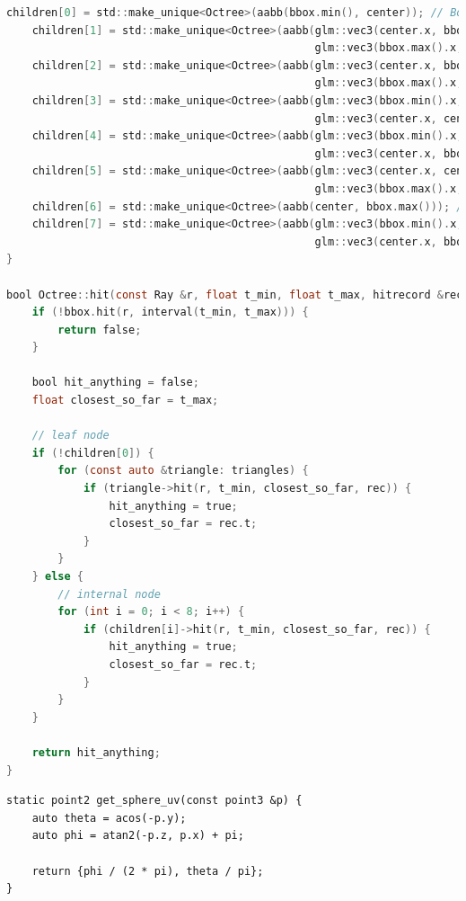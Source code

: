 \documentclass[../main.tex]{subfiles}
\begin{document}
\begin{lstlisting}[language=C, caption="Oct-Tree definition and implementation", breaklines=true]
    children[0] = std::make_unique<Octree>(aabb(bbox.min(), center)); // Bottom-left-front
    children[1] = std::make_unique<Octree>(aabb(glm::vec3(center.x, bbox.min().y, bbox.min().z),
                                                glm::vec3(bbox.max().x, center.y, center.z))); // Bottom-right-front
    children[2] = std::make_unique<Octree>(aabb(glm::vec3(center.x, bbox.min().y, center.z),
                                                glm::vec3(bbox.max().x, center.y, bbox.max().z))); // Bottom-right-back
    children[3] = std::make_unique<Octree>(aabb(glm::vec3(bbox.min().x, bbox.min().y, center.z),
                                                glm::vec3(center.x, center.y, bbox.max().z))); // Bottom-left-back
    children[4] = std::make_unique<Octree>(aabb(glm::vec3(bbox.min().x, center.y, bbox.min().z),
                                                glm::vec3(center.x, bbox.max().y, center.z))); // Top-left-front
    children[5] = std::make_unique<Octree>(aabb(glm::vec3(center.x, center.y, bbox.min().z),
                                                glm::vec3(bbox.max().x, bbox.max().y, center.z))); // Top-right-front
    children[6] = std::make_unique<Octree>(aabb(center, bbox.max())); // Top-right-back
    children[7] = std::make_unique<Octree>(aabb(glm::vec3(bbox.min().x, center.y, center.z),
                                                glm::vec3(center.x, bbox.max().y, bbox.max().z))); // Top-left-back
}

bool Octree::hit(const Ray &r, float t_min, float t_max, hitrecord &rec) const {
    if (!bbox.hit(r, interval(t_min, t_max))) {
        return false;
    }

    bool hit_anything = false;
    float closest_so_far = t_max;

    // leaf node
    if (!children[0]) {
        for (const auto &triangle: triangles) {
            if (triangle->hit(r, t_min, closest_so_far, rec)) {
                hit_anything = true;
                closest_so_far = rec.t;
            }
        }
    } else {
        // internal node
        for (int i = 0; i < 8; i++) {
            if (children[i]->hit(r, t_min, closest_so_far, rec)) {
                hit_anything = true;
                closest_so_far = rec.t;
            }
        }
    }

    return hit_anything;
}
\end{lstlisting}
\begin{lstlisting}
static point2 get_sphere_uv(const point3 &p) {
    auto theta = acos(-p.y);
    auto phi = atan2(-p.z, p.x) + pi;

    return {phi / (2 * pi), theta / pi};
}
\end{lstlisting}
\newpage
\end{document}
